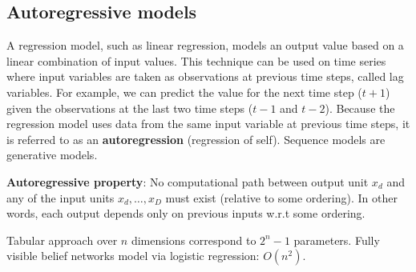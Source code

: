 \documentclass[12pt]{article}
\begin{document}
\subsection{Autoregressive models}
\par A regression model, such as linear regression, models an output value based on a linear combination of input values. This technique can be used on time series where input variables are taken as observations at previous time steps, called lag variables. For example, we can predict the value for the next time step ($t+1$) given the observations at the last two time steps ($t-1$ and $t-2$). Because the regression model uses data from the same input variable at previous time steps, it is referred to as an \textbf{autoregression} (regression of self). Sequence models are generative models.
\par \textbf{Autoregressive property}: No computational path between output unit $x_d$ and any of the input units $x_d, \dots , x_D$ must exist (relative to some ordering). In other words, each output depends only on previous inputs w.r.t some ordering.
\par Tabular approach over $n$ dimensions correspond to $2^n - 1$ parameters. Fully visible belief networks model via logistic regression: $O(n^2)$.
\end{document}
